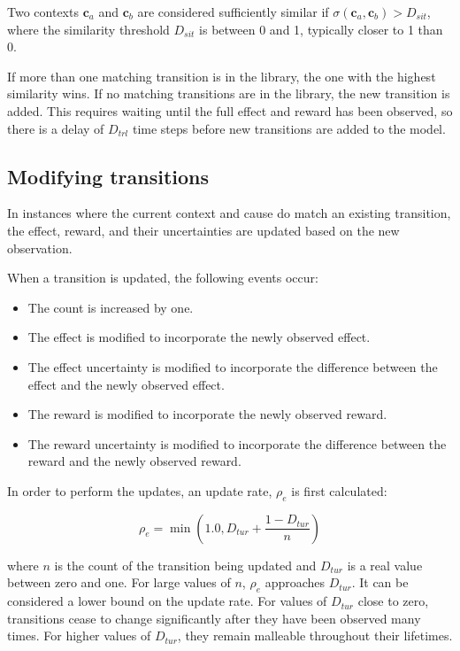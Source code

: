 Two contexts $\mathbf{c}_a$ and $\mathbf{c}_b$ are considered sufficiently similar if $\sigma(\mathbf{c}_a,\mathbf{c}_b) > D_{sit}$, where the similarity threshold $D_{sit}$ is between 0 and 1, typically closer to 1 than 0.

If more than one matching transition is in the library, the one with the highest similarity wins. If no matching transitions are in the library, the new transition is added. This requires waiting until the full effect and reward has been observed, so there is a delay of $D_{trl}$ time steps before new transitions are added to the model.

\subsection{Modifying transitions}
In instances where the current context and cause do match an existing transition, the effect, reward, and their uncertainties are updated based on the new observation.

When a transition is updated, the following events occur:
\begin{itemize}
\item The count is increased by one.
\item The effect is modified to incorporate the newly observed effect.
\item The effect uncertainty is modified to incorporate the difference between the effect and the newly observed effect.
\item The reward is modified to incorporate the newly observed reward.
\item The reward uncertainty is modified to incorporate the difference between the reward and the newly observed reward.
\end{itemize}

In order to perform the updates, an update rate, $\rho_e$ is first calculated:

\begin{equation}
\rho_e = \min(1.0, D_{tur}+ \frac{1 - D_{tur}}{n})
\end{equation}

where $n$ is the count of the transition being updated and $D_{tur}$ is a real value between zero and one. For large values of $n$, $\rho_e$ approaches $D_{tur}$. It can be considered a lower bound on the update rate. For values of $D_{tur}$ close to zero, transitions cease to change significantly after they have been observed many times. For higher values of $D_{tur}$, they remain malleable throughout their lifetimes.

